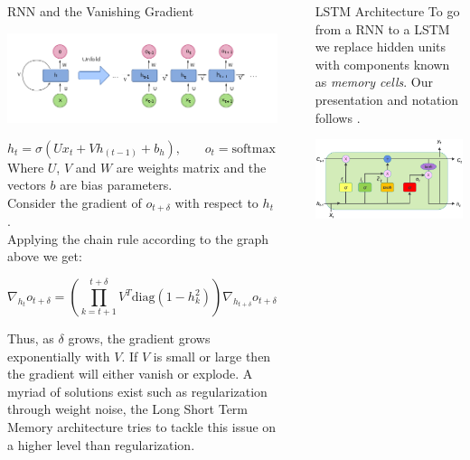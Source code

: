 \documentclass[final]{beamer}
\newlength{\sepwidth}
\newlength{\colwidth}
\newcommand{\separatorcolumn}{\begin{column}{\sepwidth}\end{column}}
\begin{document}
\begin{frame}[t]
\begin{columns}[t]
\begin{column}{\colwidth}
\begin{block}{RNN and the Vanishing Gradient} 
\begin{center}
    \includegraphics[width = 0.9\linewidth]{RNN.png}
\end{center}
\begin{equation*}
    h_t = \sigma(U x_t + V h_{(t-1)} + b_h)\text{,}
    \qquad o_t = \text{softmax}(W h_t + b_o)
\end{equation*}
\small{Where $ U$, $V$ and $W$ are weights matrix and the vectors $b$ are bias
parameters.}\\

\normalsize
Consider the gradient of $o_{t + \delta}$ with respect to $h_t$.\\
Applying the chain rule according to the graph above we get:

\begin{equation*}
  \nabla_{h_t} o_{t + \delta} = \left( \prod_{k = t+1}^{t+\delta} V^T
  \text{diag}(1 - h^2_k) \right)\nabla_{h_{t + \delta}}o_{t + \delta}.
\end{equation*}

Thus, as $\delta$ grows, the gradient grows exponentially with $V$. If $V$ is
small or large then the gradient will either vanish or explode. A myriad
of solutions exist such as regularization through weight noise, the Long Short
Term Memory architecture tries to tackle this issue on a higher level than
regularization.
\end{block}
\end{column}
\separatorcolumn

\begin{column}{\colwidth}

\begin{block}{LSTM Architecture}
To go from a RNN to a LSTM we replace hidden units with components known as
\textit{memory cells}. Our presentation and notation follows \cite{revieww}.
\begin{center}
    \includegraphics[width = 0.7\linewidth]{lstm.png}
\end{center}


\end{block}
\end{column}
\end{columns}
\end{frame}
\end{document}
